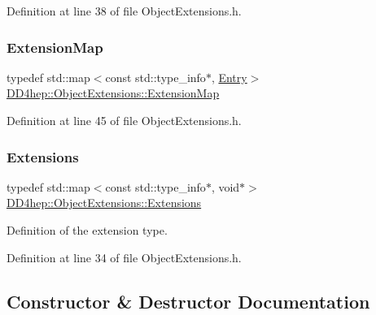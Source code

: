 Definition at line 38 of file Object\+Extensions.\+h.

\hypertarget{class_d_d4hep_1_1_object_extensions_a22c0e42d5fdc9f3fda39c2c3bec14341}{}\label{class_d_d4hep_1_1_object_extensions_a22c0e42d5fdc9f3fda39c2c3bec14341} 
\subsubsection{\texorpdfstring{Extension\+Map}{ExtensionMap}}
{\footnotesize\ttfamily typedef std\+::map$<$const std\+::type\+\_\+info$\ast$, \hyperlink{struct_d_d4hep_1_1_object_extensions_1_1_entry}{Entry}$>$ \hyperlink{class_d_d4hep_1_1_object_extensions_a22c0e42d5fdc9f3fda39c2c3bec14341}{D\+D4hep\+::\+Object\+Extensions\+::\+Extension\+Map}}



Definition at line 45 of file Object\+Extensions.\+h.

\hypertarget{class_d_d4hep_1_1_object_extensions_a882c1e22567a450f60d83eb735dd3532}{}\label{class_d_d4hep_1_1_object_extensions_a882c1e22567a450f60d83eb735dd3532} 
\subsubsection{\texorpdfstring{Extensions}{Extensions}}
{\footnotesize\ttfamily typedef std\+::map$<$const std\+::type\+\_\+info$\ast$, void$\ast$$>$ \hyperlink{class_d_d4hep_1_1_object_extensions_a882c1e22567a450f60d83eb735dd3532}{D\+D4hep\+::\+Object\+Extensions\+::\+Extensions}}



Definition of the extension type. 



Definition at line 34 of file Object\+Extensions.\+h.



\subsection{Constructor \& Destructor Documentation}
\hypertarget{class_d_d4hep_1_1_object_extensions_adb8a89136b702583d0fa502218592696}{}\label{class_d_d4hep_1_1_object_extensions_adb8a89136b702583d0fa502218592696} 
